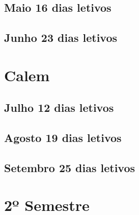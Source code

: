 \documentclass[thesis]{hmcposter}
\begin{document}
\begin{poster}
								\subsection{Maio \hfill 16 dias letivos}\subsection{Junho \hfill 23 dias letivos}\newpage
\section{\color{hmcorange}Calem}\subsection{Julho \hfill 12 dias letivos}\subsection{Agosto \hfill 19 dias letivos}\subsection{Setembro \hfill 25 dias letivos}\vfill\null
\columnbreak
\section{\hfill \color{hmcorange}2º Semestre}

\end{poster}
\end{document}
